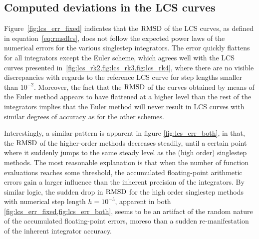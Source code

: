 \subsection{Computed deviations in the LCS curves}
\label{sub:computed_deviations_in_the_lcs_curves}





Figure~\ref{fig:lcs_err_fixed} indicates that the $\operatorname{RMSD}$ of the LCS curves,
as defined in equation~\eqref{eq:rmsdlcs}, does not follow the expected power
laws of the numerical errors for the various singlestep integrators. The error
quickly flattens for all integrators except the Euler scheme, which agrees well
with the LCS curves presented in~\cref{fig:lcs_rk2,fig:lcs_rk3,fig:lcs_rk4},
where there are no visible discrepancies with regards to the reference LCS curve
for step lengths smaller than $10^{-2}$. Moreover, the fact that the $\operatorname{RMSD}$
of the curves obtained by means of the Euler method appears to have flattened
at a higher level than the rest of the integrators implies that the Euler
method will never result in LCS curves with similar degrees of accuracy
as for the other schemes.

Interestingly, a similar pattern is apparent in figure
\ref{fig:lcs_err_both}, in that, the $\operatorname{RMSD}$ of the higher-order methods
decreases steadily, until a certain point where it suddenly jumps to the same
steady level as the (high order) singlestep methods. The most reasonable
explanation is that when the number of function evaluations reaches some
threshold, the accumulated floating-point arithmetic errors gain a larger
influence than the inherent precision of the integrators. By similar logic, the
sudden drop in $\operatorname{RMSD}$ for the high order singlestep methods with numerical
step length $h=10^{-5}$, apparent in both
\cref{fig:lcs_err_fixed,fig:lcs_err_both}, seems to be an artifact of the random
nature of the accumulated floating-point errors, moreso than a sudden
re-manifestation of the inherent integrator accuracy.

